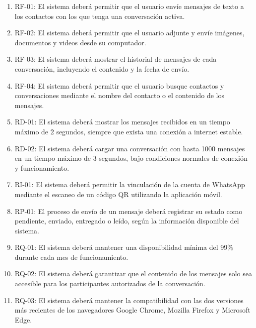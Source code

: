 \documentclass[12pt,a4paper,oneside]{article}
\begin{document}
\begin{enumerate}[leftmargin=1.5cm]

    \item RF-01: El sistema deberá permitir que el usuario envíe mensajes de texto a los contactos con los que tenga una conversación activa.

    \item RF-02: El sistema deberá permitir que el usuario adjunte y envíe imágenes, documentos y videos desde su computador.

    \item RF-03: El sistema deberá mostrar el historial de mensajes de cada conversación, incluyendo el contenido y la fecha de envío.

    \item RF-04: El sistema deberá permitir que el usuario busque contactos y conversaciones mediante el nombre del contacto o el contenido de los mensajes.

    \item RD-01: El sistema deberá mostrar los mensajes recibidos en un tiempo máximo de 2 segundos, siempre que exista una conexión a internet estable.

    \item RD-02: El sistema deberá cargar una conversación con hasta 1000 mensajes en un tiempo máximo de 3 segundos, bajo condiciones normales de conexión y funcionamiento.

    \item RI-01: El sistema deberá permitir la vinculación de la cuenta de WhatsApp mediante el escaneo de un código QR utilizando la aplicación móvil.

    \item RP-01: El proceso de envío de un mensaje deberá registrar su estado como pendiente, enviado, entregado o leído, según la información disponible del sistema.

    \item RQ-01: El sistema deberá mantener una disponibilidad mínima del 99\% durante cada mes de funcionamiento.

    \item RQ-02: El sistema deberá garantizar que el contenido de los mensajes solo sea accesible para los participantes autorizados de la conversación.

    \item RQ-03: El sistema deberá mantener la compatibilidad con las dos versiones más recientes de los navegadores Google Chrome, Mozilla Firefox y Microsoft Edge.


\end{enumerate}
\end{document}
